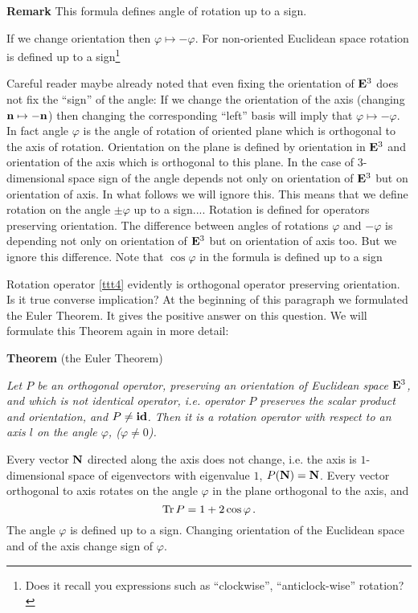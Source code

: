\documentclass[12pt]{article}
\numberwithin{equation}{section}
\begin{document}
{\bf Remark} This formula defines angle of rotation up to a sign.

{\footnotesize
If we change orientation then $\varphi\mapsto-\varphi$.
For non-oriented Euclidean
   space rotation is defined up to a sign\footnote{ Does it recall
you expressions such as ``clockwise'', ``anticlock-wise'' rotation?}

Careful reader maybe already noted that even fixing the orientation of
${\bf E}^3$ does not fix the ``sign'' of the angle:
If we change the orientation of the axis (changing ${\bf n}\mapsto-{\bf n}$)
then changing the corresponding ``left'' basis will imply
that $\varphi\mapsto-\varphi$.
{\footnotesize In fact angle $\varphi$ is the angle of rotation of oriented plane
which is orthogonal to the axis of rotation. Orientation on the
plane is defined by orientation in ${\bf E}^3$ and orientation of
the axis which is orthogonal to this plane.}
In the case of $3$-dimensional space sign of the angle
depends not only on orientation of ${\bf E}^3$ but on orientation
of axis. In what follows we will ignore this. This means that
we define rotation on the angle $\pm \varphi$ up to a sign....
Rotation is defined for operators preserving orientation.
The difference between angles of rotations $\varphi$ and $-\varphi$
is depending not only on orientation of ${\bf E}^3$ but on orientation of
axis too. But we ignore this difference. Note that
$\cos\varphi$ in the formula \label{eulerformula2}
is defined up to a sign

 }
\m

  Rotation operator \eqref{ttt4} evidently is orthogonal operator preserving orientation.
  Is it true converse implication?
At the beginning of this paragraph we formulated the Euler Theorem.
It gives the positive answer on this question.
   We will formulate this Theorem again in more detail:



\bigskip

   {\bf Theorem} (the Euler Theorem)
{\it Let $P$ be an orthogonal operator,
preserving an orientation of Euclidean space ${\bf E}^3$,
and which is not identical operator,  i.e. operator
$P$ preserves the scalar product and orientation, and $P\not={\bf id}$.
Then it is a
rotation operator with respect to an axis $l$ on the angle $\varphi$,
($\varphi\not=0$).

  Every vector ${\bf N}$ directed along the axis does not change,
i.e. the axis is $1$-dimensional space of eigenvectors with eigenvalue
$1$, $P({\bf N})={\bf N}$.
Every vector orthogonal to axis rotates on the angle $\varphi$
 in the plane orthogonal to the axis, and
             $$
      {\rm Tr\,}P=1+2\cos\varphi\,.
             $$
The angle $\varphi$ is defined up to a sign. Changing orientation of
the Euclidean space and of the axis change sign of $\varphi$.

}
\end{document}
